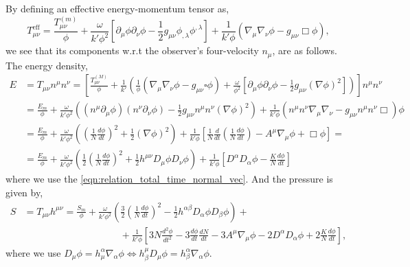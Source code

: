 By defining an effective energy-momentum tensor as,
\begin{equation}
    T^{\mathrm{eff}}_{\mu\nu}=\frac{T_{\mu\nu}^{(m)}}{\phi}+\frac{\omega}{k'\phi^2}\left[\partial_\mu \phi \partial_\nu \phi-\frac{1}{2}g_{\mu\nu}\phi_{,\lambda}\phi^{,\lambda}\right]+\frac{1}{k'\phi}\left(\nabla_\mu\nabla_\nu\phi-g_{\mu\nu}\Box\phi\right),
\end{equation}
we see that its components w.r.t the observer's four-velocity $n_\mu$, are as follows. The energy density,
\begin{align}
    E &= T_{\mu\nu}n^\mu n^\nu=\left[\frac{T^{(M)}_{\mu \nu}}{\phi}+\frac{1}{k'}\left(\frac{1}{\phi}\left(\nabla_\mu \nabla_\nu \phi-g_{\mu \nu} \square \phi\right)+\frac{\omega}{\phi^2}\left[\partial_\mu \phi \partial_\nu \phi-\frac{1}{2} g_{\mu \nu}(\nabla \phi)^2\right]\right)\right]n^\mu n^\nu\nonumber\\
    &=\frac{E_m}{\phi}+\frac{\omega}{k'\phi^2}\left((n^\mu\partial_\mu \phi)(n^\nu\partial_\nu\phi)-\frac{1}{2}g_{\mu\nu}n^\mu n^\nu (\nabla \phi)^2\right)+\frac{1}{k'\phi}\left(n^\mu n^\nu \nabla_\mu \nabla_\nu - g_{\mu\nu}n^\mu n^\nu \Box\right)\phi\nonumber\\
    &=\frac{E_m}{\phi}+\frac{\omega}{k'\phi^2}\left(\left(\frac{1}{N}\frac{d\phi}{dt}\right)^2+\frac{1}{2}(\nabla\phi)^2\right)+\frac{1}{k'\phi}\left[\frac{1}{N}\frac{d}{dt}\left(\frac{1}{N}\frac{d\phi}{dt}\right)-A^\mu\nabla_\mu\phi+\Box\phi\right]=\nonumber\\
    &=\frac{E_m}{\phi}+\frac{\omega}{k'\phi^2}\left(\frac{1}{2}\left(\frac{1}{N}\frac{d\phi}{dt}\right)^2+\frac{1}{2}h^{\mu\nu}D_\mu\phi D_\nu\phi\right)+\frac{1}{k'\phi}\left[D^\alpha D_\alpha\phi-\frac{K}{N}\frac{d\phi}{dt}\right]
    \label{eqn:energy_density_jf}
\end{align}
where we use the \cref{eqn:relation_total_time_normal_vec}. And the pressure is given by,
\begin{align}
    S&=T_{\mu\nu}h^{\mu\nu}=\frac{S_m}{\phi}+\frac{\omega}{k'\phi^2}\left(\frac{3}{2}\left(\frac{1}{N}\frac{d\phi}{dt}\right)^2 -\frac{1}{2}h^{\alpha\beta} D_\alpha\phi D_\beta\phi\right)+\label{eqn:pressure_jf}\\
    &\qquad\qquad\qquad\qquad\qquad+\frac{1}{k'\phi}\left[3N\frac{d^2\phi}{dt^2}-3\frac{d\phi}{dt}\frac{dN}{dt}-3A^\mu\nabla_\mu\phi -2D^\alpha D_\alpha \phi+2\frac{K}{N}\frac{d\phi}{dt} \right],\nonumber
\end{align}
where we use $D_\mu \phi = h_\mu^\alpha \nabla_\alpha\phi \Leftrightarrow h^\mu_\beta D_\mu \phi = h^\alpha_\beta \nabla_\alpha \phi$.




